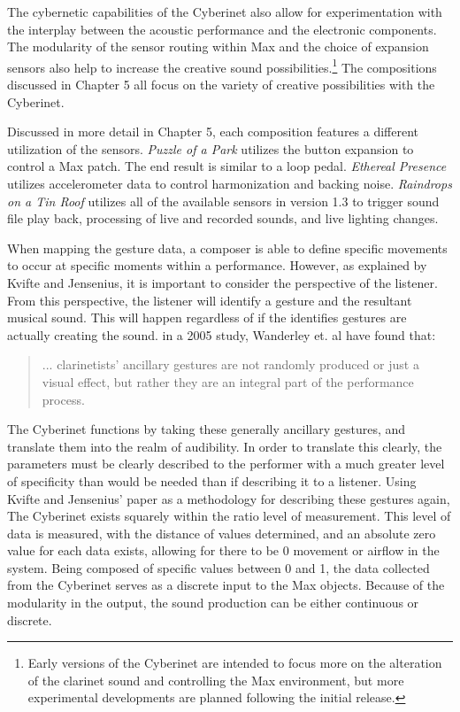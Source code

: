 The cybernetic capabilities of the Cyberinet also allow for experimentation with the interplay between the acoustic performance and the electronic components. The modularity of the sensor routing within Max and the choice of expansion sensors also help to increase the creative sound possibilities.\footnote{Early versions of the Cyberinet are intended to focus more on the alteration of the clarinet sound and controlling the Max environment, but more experimental developments are planned following the initial release.} The compositions discussed in Chapter 5 all focus on the variety of creative possibilities with the Cyberinet. 

Discussed in more detail in Chapter 5, each composition features a different utilization of the sensors. \textit{Puzzle of a Park} utilizes the button expansion to control a Max patch. The end result is similar to a loop pedal. \textit{Ethereal Presence} utilizes accelerometer data to control harmonization and backing noise. \textit{Raindrops on a Tin Roof} utilizes all of the available sensors in version 1.3 to trigger sound file play back, processing of live and recorded sounds, and live lighting changes.

When mapping the gesture data, a composer is able to define specific movements to occur at specific moments within a performance. However, as explained by Kvifte and Jensenius, it is important to consider the perspective of the listener\cite{KvifteJenseniusDescription}. From this perspective, the listener will identify a gesture and the resultant musical sound. This will happen regardless of if the identifies gestures are actually creating the sound. in a 2005 study, Wanderley et. al have found that:

\begin{quote}
    ... clarinetists' ancillary gestures are not randomly produced or just a visual effect, but rather they are an integral part of the performance process\cite{wanderleyClarinetGesture2005}.
\end{quote}

The Cyberinet functions by taking these generally ancillary gestures, and translate them into the realm of audibility. In order to translate this clearly, the parameters must be clearly described to the performer with a much greater level of specificity than would be needed than if describing it to a listener\cite{KvifteJenseniusDescription}. Using Kvifte and Jensenius' paper as a methodology for describing these gestures again, The Cyberinet exists squarely within the ratio level of measurement. This level of data is measured, with the distance of values determined, and an absolute zero value for each data exists, allowing for there to be 0 movement or airflow in the system. Being composed of specific values between 0 and 1, the data collected from the Cyberinet serves as a discrete input to the Max objects. Because of the modularity in the output, the sound production can be either continuous or discrete.

